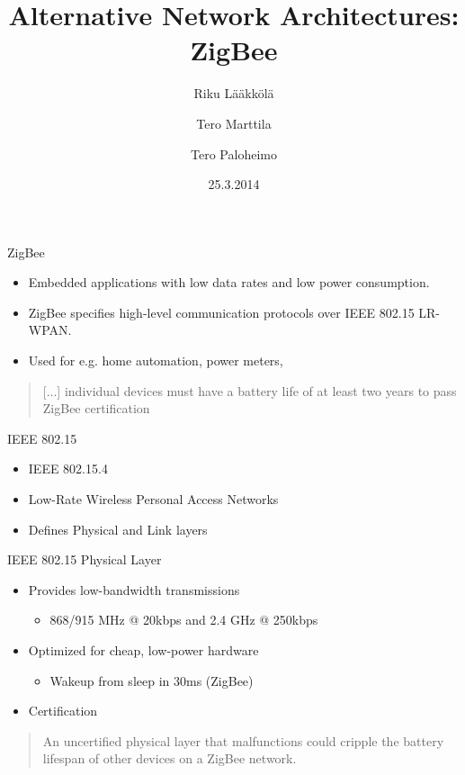 \documentclass{beamer}
\title[ZigBee]{Alternative Network Architectures: ZigBee}
\author{Riku Lääkkölä \and Tero Marttila \and Tero Paloheimo}
\institute{Aalto ELEC}
\date{25.3.2014}
\begin{document}
\begin{frame}
  	\titlepage
\end{frame}


\begin{frame}{ZigBee}
  \begin{itemize}
  	\item Embedded applications with low data rates and low power consumption.
    \item ZigBee specifies high-level communication protocols over IEEE 802.15 LR-WPAN.
    \item Used for e.g. home automation, power meters, 
  \end{itemize}
  \begin{quotation}
  [...] individual devices must have a battery life of at least two years to pass ZigBee certification
  \end{quotation}
\end{frame}

\begin{frame}{IEEE 802.15}
  \begin{itemize}
  	\item IEEE 802.15.4
  	\item Low-Rate Wireless Personal Access Networks
	\item Defines Physical and Link layers
  	
  \end{itemize}
\end{frame}

\begin{frame}{IEEE 802.15 Physical Layer}
  \begin{itemize}
  	\item Provides low-bandwidth transmissions
  	\begin{itemize}
  		\item 868/915 MHz @ 20kbps and 2.4 GHz @ 250kbps
  	\end{itemize}
  	\item Optimized for cheap, low-power hardware
  	\begin{itemize}
    	\item Wakeup from sleep in 30ms (ZigBee)
  	\end{itemize}
  	\item Certification 
  \end{itemize}
  \begin{quotation}
  	An uncertified physical layer that malfunctions could cripple the battery lifespan of other devices on a ZigBee network.
  \end{quotation}
\end{frame}
\end{document}
